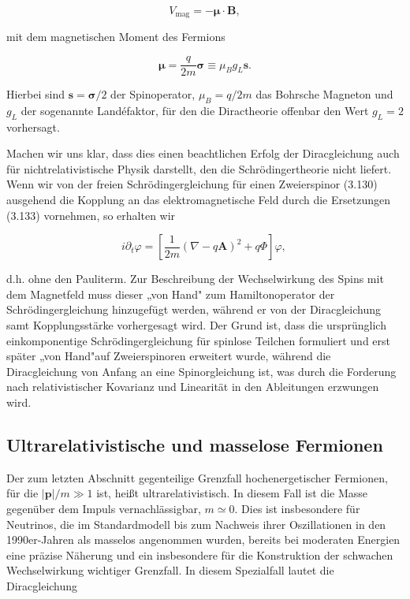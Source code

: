 \documentclass[10pt, letterpaper]{article}
\begin{document}
$$
V_{\mathrm{mag}}=-\boldsymbol{\mu} \cdot \mathbf{B},
$$

mit dem magnetischen Moment des Fermions

$$
\boldsymbol{\mu}=\frac{q}{2 m} \boldsymbol{\sigma} \equiv \mu_{B} g_{L} \mathbf{s} .
$$

Hierbei sind $\mathbf{s}=\boldsymbol{\sigma} / 2$ der Spinoperator, $\mu_{B}=q / 2 m$ das Bohrsche Magneton und $g_{L}$ der sogenannte Landéfaktor, für den die Diractheorie offenbar den Wert $g_{L}=2$ vorhersagt.

Machen wir uns klar, dass dies einen beachtlichen Erfolg der Diracgleichung auch für nichtrelativistische Physik darstellt, den die Schrödingertheorie nicht liefert. Wenn wir von der freien Schrödingergleichung für einen Zweierspinor (3.130)\\
ausgehend die Kopplung an das elektromagnetische Feld durch die Ersetzungen (3.133) vornehmen, so erhalten wir

$$
i \partial_{t} \varphi=\left[\frac{1}{2 m}(\nabla-q \mathbf{A})^{2}+q \Phi\right] \varphi \text {, }
$$

d.h. ohne den Pauliterm. Zur Beschreibung der Wechselwirkung des Spins mit dem Magnetfeld muss dieser „von Hand" zum Hamiltonoperator der Schrödingergleichung hinzugefügt werden, während er von der Diracgleichung samt Kopplungsstärke vorhergesagt wird. Der Grund ist, dass die ursprünglich einkomponentige Schrödingergleichung für spinlose Teilchen formuliert und erst später „von Hand"auf Zweierspinoren erweitert wurde, während die Diracgleichung von Anfang an eine Spinorgleichung ist, was durch die Forderung nach relativistischer Kovarianz und Linearität in den Ableitungen erzwungen wird.

\pagebreak

\subsection{Ultrarelativistische und masselose Fermionen}
Der zum letzten Abschnitt gegenteilige Grenzfall hochenergetischer Fermionen, für die $|\mathbf{p}| / m \gg 1$ ist, heißt ultrarelativistisch. In diesem Fall ist die Masse gegenüber dem Impuls vernachlässigbar, $m \simeq 0$. Dies ist insbesondere für Neutrinos, die im Standardmodell bis zum Nachweis ihrer Oszillationen in den 1990er-Jahren als masselos angenommen wurden, bereits bei moderaten Energien eine präzise Näherung und ein insbesondere für die Konstruktion der schwachen Wechselwirkung wichtiger Grenzfall. In diesem Spezialfall lautet die Diracgleichung
\end{document}
